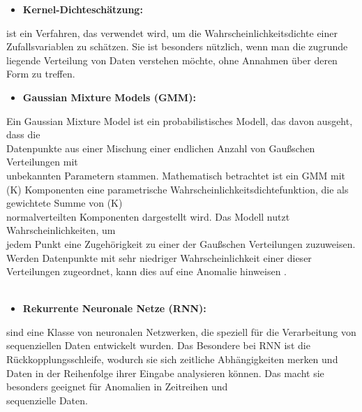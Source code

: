 \begin{itemize} \item \textbf{Kernel-Dichteschätzung:}\end{itemize} ist ein Verfahren, das verwendet wird, um die Wahrscheinlichkeitsdichte einer Zufallsvariablen zu schätzen. Sie ist besonders nützlich, wenn man die zugrunde liegende Verteilung von Daten verstehen möchte, ohne Annahmen über deren Form zu treffen\cite{Kernel}.
\\
\begin{itemize} \item \textbf{Gaussian Mixture Models (GMM):}\end{itemize} Ein Gaussian Mixture Model ist ein probabilistisches Modell, das davon ausgeht, dass die \\ Datenpunkte aus einer Mischung einer endlichen Anzahl von Gaußschen Verteilungen mit \\unbekannten Parametern stammen. Mathematisch betrachtet ist ein GMM mit (K) Komponenten eine parametrische Wahrscheinlichkeitsdichtefunktion, die als gewichtete Summe von (K) \\ normalverteilten Komponenten dargestellt wird.
Das Modell nutzt Wahrscheinlichkeiten, um \\ jedem Punkt eine Zugehörigkeit zu einer der Gaußschen Verteilungen zuzuweisen. \\ Werden Datenpunkte mit sehr niedriger Wahrscheinlichkeit einer dieser Verteilungen zugeordnet, kann dies auf eine Anomalie hinweisen\cite{GMM} \cite{GMM2}.
\\
\\
\begin{itemize} \item \textbf{Rekurrente Neuronale Netze (RNN):}\end{itemize} sind eine Klasse von neuronalen Netzwerken, die speziell für die Verarbeitung von \\ sequenziellen Daten entwickelt wurden. Das Besondere bei RNN ist die Rückkopplungsschleife, wodurch sie sich zeitliche Abhängigkeiten merken und Daten in der Reihenfolge ihrer Eingabe analysieren können. Das macht sie besonders geeignet für Anomalien in Zeitreihen und \\ sequenzielle Daten\cite{GAN}. 
\\
